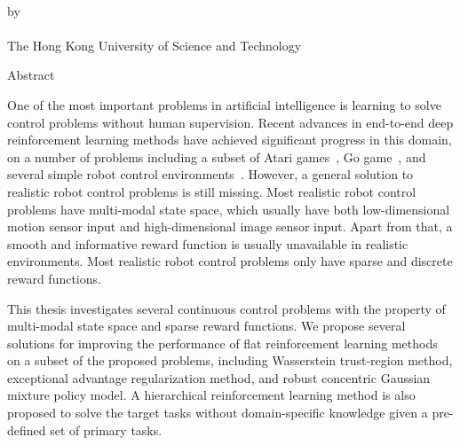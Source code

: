 \begin{center}
{\Large \thesistitle}\\
\vspace{20mm}
by \thesisauthor\\
\vspace{15mm}
\departmentname\\
\vspace{10mm}
The Hong Kong University of Science and Technology
\end{center}
\vspace{8mm}
\begin{center}
Abstract
\end{center}
One of the most important problems in artificial intelligence is learning to solve control problems without human supervision. Recent advances in end-to-end deep reinforcement learning methods have achieved significant progress in this domain, on a number of problems including a subset of Atari games~\cite{mnih2015human}, Go game~\cite{silver2016mastering}, and several simple robot control environments~\cite{duan2016benchmarking}.  However, a general solution to realistic robot control problems is still missing. Most realistic robot control problems have multi-modal state space, which usually have both low-dimensional motion sensor input and high-dimensional image sensor input. Apart from that, a smooth and informative reward function is usually unavailable in realistic environments. Most realistic robot control problems only have sparse and discrete reward functions.

This thesis investigates several continuous control problems with the property of multi-modal state space and sparse reward functions. We propose several solutions for improving the performance of flat reinforcement learning methods on a subset of the proposed problems, including Wasserstein trust-region method, exceptional advantage regularization method, and robust concentric Gaussian mixture policy model. A hierarchical reinforcement learning method is also proposed to solve the target tasks without domain-specific knowledge given a pre-defined set of primary tasks. 

\par
\noindent


